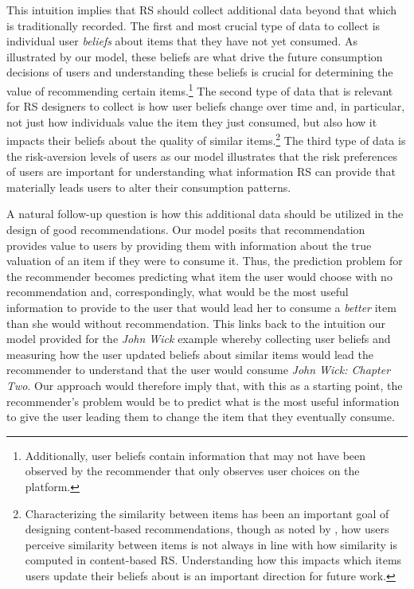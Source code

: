 \documentclass[manuscript, nonacm]{acmart}
\begin{document}
This intuition implies that RS should collect additional data beyond that which is traditionally recorded. The first and most crucial type of data to collect is individual user \textit{beliefs} about items that they have not yet consumed. As illustrated by our model, these beliefs are what drive the future consumption decisions of users and understanding these beliefs is crucial for determining the value of recommending certain items.\footnote{Additionally, user beliefs contain information that may not have been observed by the recommender that only observes user choices on the platform.} The second type of data that is relevant for RS designers to collect is how user beliefs change over time and, in particular, not just how individuals value the item they just consumed, but also how it impacts their beliefs about the quality of similar items.\footnote{Characterizing the similarity between items has been an important goal of designing content-based recommendations, though as noted by \cite{winecoff2019users}, how users perceive similarity between items is not always in line with how similarity is computed in content-based RS. Understanding how this impacts which items users update their beliefs about is an important direction for future work.} The third type of data is the risk-aversion levels of users as our model illustrates that the risk preferences of users are important for understanding what information RS can provide that materially leads users to alter their consumption patterns.
\par 
A natural follow-up question is how this additional data should be utilized in the design of good recommendations. Our model posits that recommendation provides value to users by providing them with information about the true valuation of an item if they were to consume it. Thus, the prediction problem for the recommender becomes predicting what item the user would choose with no recommendation and, correspondingly, what would be the most useful information to provide to the user that would lead her to consume a \textit{better} item than she would without recommendation. This links back to the intuition our model provided for the \textit{John Wick} example whereby collecting user beliefs and measuring how the user updated beliefs about similar items would lead the recommender to understand that the user would consume \textit{John Wick: Chapter Two}. Our approach would therefore imply that, with this as a starting point, the recommender's problem would be to predict what is the most useful information to give the user leading them to change the item that they eventually consume.
\end{document}
